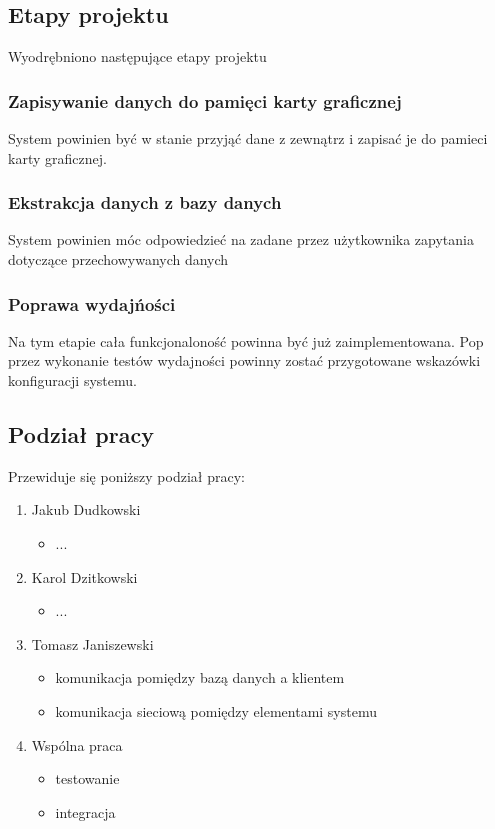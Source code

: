 \documentclass[paper=a4, fontsize=11pt]{scrartcl} %
\numberwithin{equation}{section} %
\numberwithin{figure}{section} %
\numberwithin{table}{section} %
\begin{document}
    \subsection{Etapy projektu}
    Wyodrębniono następujące etapy projektu
        \subsubsection{Zapisywanie danych do pamięci karty graficznej}
            System powinien być w stanie przyjąć dane z zewnątrz i zapisać je do pamieci karty graficznej.
        \subsubsection{Ekstrakcja danych z bazy danych}
            System powinien móc odpowiedzieć na zadane przez użytkownika zapytania dotyczące przechowywanych danych
        \subsubsection{Poprawa wydajńości}
            Na tym etapie cała funkcjonaloność powinna być już zaimplementowana. Pop przez wykonanie testów wydajności
            powinny zostać przygotowane wskazówki konfiguracji systemu.

    \subsection{Podział pracy}
    Przewiduje się poniższy podział pracy:
        \begin{enumerate}
            \item Jakub Dudkowski
                \begin{itemize}
                    \item ...
                \end{itemize}
            \item Karol Dzitkowski
                \begin{itemize}
                    \item ...
                \end{itemize}
            \item Tomasz Janiszewski
                \begin{itemize}
                    \item komunikacja pomiędzy bazą danych a klientem
                    \item komunikacja sieciową pomiędzy elementami systemu
                \end{itemize}
            \item Wspólna praca
                \begin{itemize}
                    \item testowanie
                    \item integracja
                \end{itemize}
        \end{enumerate}
\end{document}
